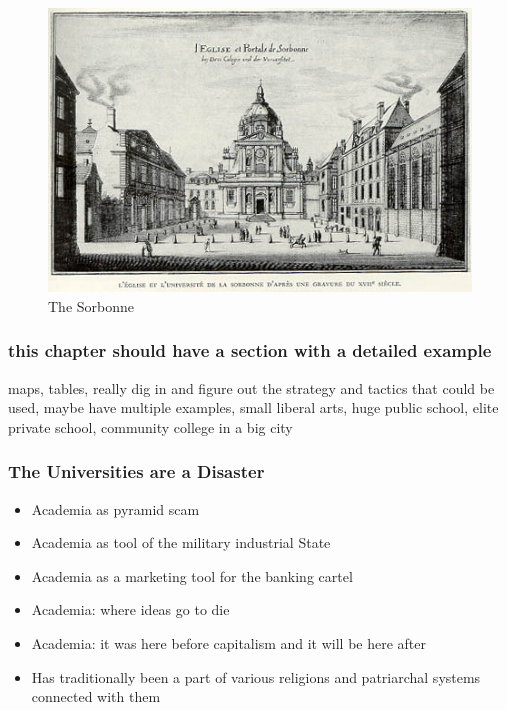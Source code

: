 \begin{figure}[htbp]
\centering
\includegraphics{images/Sorbonne_17thc.jpg}
\caption{The Sorbonne}
\end{figure}

\subsubsection{this chapter should have a section with a detailed
example}\label{this-chapter-should-have-a-section-with-a-detailed-example}

maps, tables, really dig in and figure out the strategy and tactics that
could be used, maybe have multiple examples, small liberal arts, huge
public school, elite private school, community college in a big city

\subsubsection{The Universities are a
Disaster}\label{the-universities-are-a-disaster}

\begin{itemize}
\item
  Academia as pyramid scam
\item
  Academia as tool of the military industrial State
\item
  Academia as a marketing tool for the banking cartel
\item
  Academia: where ideas go to die
\item
  Academia: it was here before capitalism and it will be here after
\item
  Has traditionally been a part of various religions and patriarchal
  systems connected with them
\end{itemize}

